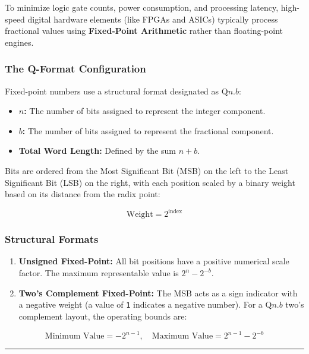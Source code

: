\documentclass[
]{article}
\providecommand{\tightlist}{%
  \setlength{\itemsep}{0pt}\setlength{\parskip}{0pt}}
\begin{document}
To minimize logic gate counts, power consumption, and processing
latency, high-speed digital hardware elements (like FPGAs and ASICs)
typically process fractional values using \textbf{Fixed-Point
Arithmetic} rather than floating-point engines.

\subsubsection{The Q-Format
Configuration}\label{the-q-format-configuration}

Fixed-point numbers use a structural format designated as
\textbf{\(\text{Q}n.b\)}:

\begin{itemize}
\tightlist
\item
  \textbf{\(n\):} The number of bits assigned to represent the integer
  component.
\item
  \textbf{\(b\):} The number of bits assigned to represent the
  fractional component.
\item
  \textbf{Total Word Length:} Defined by the sum \(n + b\).
\end{itemize}

Bits are ordered from the Most Significant Bit (MSB) on the left to the
Least Significant Bit (LSB) on the right, with each position scaled by a
binary weight based on its distance from the radix point:

\[\text{Weight} = 2^{\text{index}}\]

\subsubsection{Structural Formats}\label{structural-formats}

\begin{enumerate}
\def\labelenumi{\arabic{enumi}.}
\tightlist
\item
  \textbf{Unsigned Fixed-Point:} All bit positions have a positive
  numerical scale factor. The maximum representable value is
  \(2^n - 2^{-b}\).
\item
  \textbf{Two's Complement Fixed-Point:} The MSB acts as a sign
  indicator with a negative weight (a value of \texttt{1} indicates a
  negative number). For a \(\text{Q}n.b\) two's complement layout, the
  operating bounds are:
\end{enumerate}

\[\text{Minimum Value} = -2^{n-1}, \quad \text{Maximum Value} = 2^{n-1} - 2^{-b}\]

\begin{center}\rule{0.5\linewidth}{0.5pt}\end{center}
\end{document}
